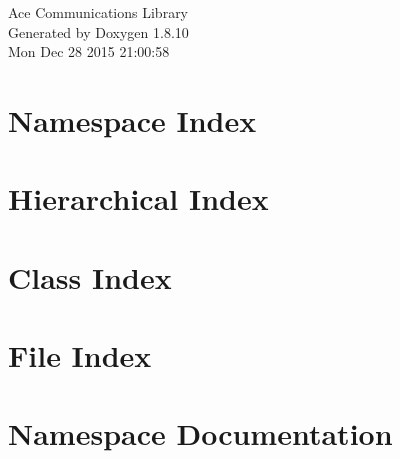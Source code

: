 \documentclass[twoside]{book}
\newcommand{\+}{\discretionary{\mbox{\scriptsize$\hookleftarrow$}}{}{}}
\newcommand{\clearemptydoublepage}{%
  \newpage{\pagestyle{empty}\cleardoublepage}%
}
\begin{document}
\hypersetup{pageanchor=false,
             bookmarks=true,
             bookmarksnumbered=true,
             pdfencoding=unicode
            }
\begin{titlepage}
\vspace*{7cm}
\begin{center}%
{\Large Ace Communications Library }\\
\vspace*{1cm}
{\large Generated by Doxygen 1.8.10}\\
\vspace*{0.5cm}
{\small Mon Dec 28 2015 21:00:58}\\
\end{center}
\end{titlepage}
\clearemptydoublepage
\tableofcontents
\clearemptydoublepage
{}
\hypersetup{pageanchor=true}

\chapter{Namespace Index}

\chapter{Hierarchical Index}

\chapter{Class Index}

\chapter{File Index}

\chapter{Namespace Documentation}


\end{document}
